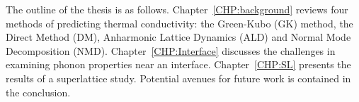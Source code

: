 The outline of the thesis is as follows. Chapter~\ref{CHP:background} reviews four methods of predicting thermal conductivity: the Green-Kubo (GK) method, the Direct Method (DM), Anharmonic Lattice Dynamics (ALD) and Normal Mode Decomposition (NMD). Chapter~\ref{CHP:Interface} discusses the challenges in examining phonon properties near an interface. Chapter~\ref{CHP:SL} presents the results of a superlattice study. Potential avenues for future work is contained in the conclusion.

